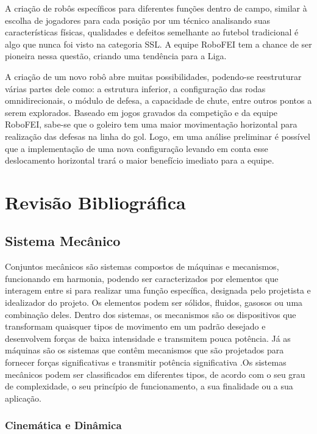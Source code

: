 \documentclass[deposito, acronym, symbols]{fei}
\begin{document}
A criação de robôs específicos para diferentes funções dentro de campo, similar à escolha de jogadores para cada posição por um técnico analisando suas características físicas, qualidades e defeitos semelhante ao futebol tradicional é algo que nunca foi visto na categoria SSL. A equipe RoboFEI tem a chance de ser pioneira nessa questão, criando uma tendência para a Liga.

A criação de um novo robô abre muitas possibilidades, podendo-se reestruturar várias partes dele como: a estrutura inferior, a configuração das rodas omnidirecionais, o módulo de defesa, a capacidade de chute, entre outros pontos a serem explorados. Baseado em jogos gravados da competição e da equipe RoboFEI, sabe-se que o goleiro tem uma maior movimentação horizontal para realização das defesas na linha do gol. Logo, em uma análise preliminar é possível que a implementação de uma nova configuração levando em conta esse deslocamento horizontal trará o maior benefício imediato para a equipe. 

\chapter{Revisão Bibliográfica}

\section{Sistema Mecânico}

Conjuntos mecânicos são sistemas compostos de máquinas e mecanismos, funcionando em harmonia, podendo ser caracterizados por elementos que interagem entre si para realizar uma função específica, designada pelo projetista e idealizador do projeto. Os elementos podem ser sólidos, fluidos, gasosos ou uma combinação deles. Dentro dos sistemas, os mecanismos são os dispositivos que transformam quaisquer tipos de movimento em um padrão desejado e desenvolvem forças de baixa intensidade e transmitem pouca potência. Já as máquinas são os sistemas que contêm mecanismos que são projetados para fornecer forças significativas e transmitir potência significativa \cite{norton2010cinematica}.Os sistemas mecânicos podem ser classificados em diferentes tipos, de acordo com o seu grau de complexidade, o seu princípio de funcionamento, a sua finalidade ou a sua aplicação.

\subsection{Cinemática e Dinâmica}
\end{document}
